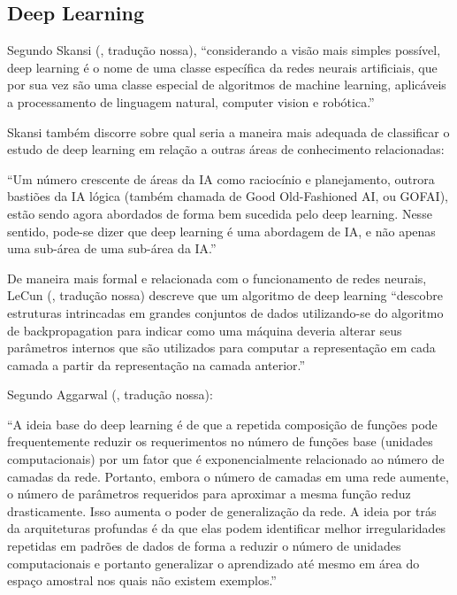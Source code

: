 \subsection {Deep Learning}
Segundo Skansi (\citeyear{skansi18}, tradução nossa), “considerando a visão mais simples possível, deep learning é o nome de uma classe específica da redes neurais artificiais, que por sua vez são uma classe especial de algoritmos de machine learning, aplicáveis a processamento de linguagem natural, computer vision e robótica.”

Skansi também discorre sobre qual seria a maneira mais adequada de classificar o estudo de deep learning em relação a outras áreas de conhecimento relacionadas:

\begin{citacao}
“Um número crescente de áreas da IA como raciocínio e planejamento, outrora bastiões da IA lógica (também chamada de Good Old-Fashioned AI, ou GOFAI), estão sendo agora abordados de forma bem sucedida pelo deep learning. Nesse sentido, pode-se dizer que deep learning é uma abordagem de IA, e não apenas uma sub-área de uma sub-área da IA.”
\end{citacao}

De maneira mais formal e relacionada com o funcionamento de redes neurais, LeCun (\citeyear{lecun15}, tradução nossa) descreve que um algoritmo de deep learning “descobre estruturas intrincadas em grandes conjuntos de dados utilizando-se do algoritmo de backpropagation para indicar como uma máquina deveria alterar seus parâmetros internos que são utilizados para computar a representação em cada camada a partir da representação na camada anterior.”

Segundo Aggarwal (\citeyear{aggar18}, tradução nossa):

\begin{citacao}
“A ideia base do deep learning é de que a repetida composição de funções pode frequentemente reduzir os requerimentos no número de funções base (unidades computacionais) por um fator que é exponencialmente relacionado ao número de camadas da rede. Portanto, embora o número de camadas em uma rede aumente, o número de parâmetros requeridos para aproximar a mesma função reduz drasticamente. Isso aumenta o poder de generalização da rede. A ideia por trás da arquiteturas profundas é da que elas podem identificar melhor irregularidades repetidas em padrões de dados de forma a reduzir o número de unidades computacionais e portanto generalizar o aprendizado até mesmo em área do espaço amostral nos quais não existem exemplos.”
\end{citacao}

